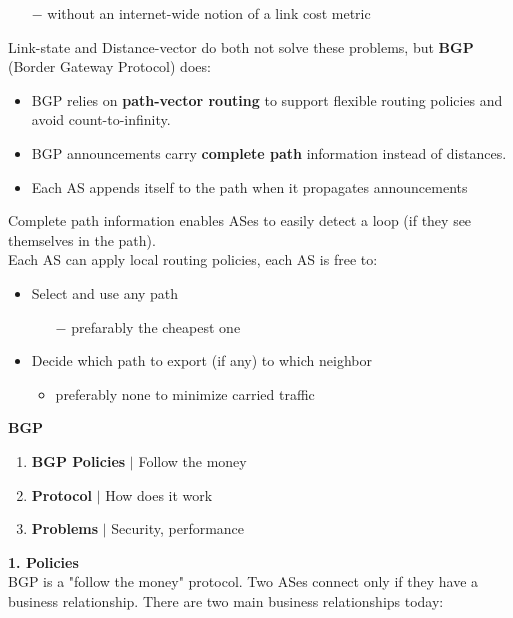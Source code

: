 \documentclass[a4paper, fontsize=8pt, landscape, DIV=1]{scrartcl}
\begin{document}
\begin{multicols*}{4}
\begin{itemize}[noitemsep]
\begin{itemize}
 				\item[$-$] without an internet-wide notion of a link cost metric
 			\end{itemize}		
		 \end{itemize}
	 	Link-state and Distance-vector do both not solve these problems, but \textbf{BGP} (Border Gateway Protocol) does:
	 	\begin{itemize}[noitemsep]
	 		\item BGP relies on \textbf{path-vector routing} to support flexible routing policies and avoid count-to-infinity.
	 		\item BGP announcements carry \textbf{complete path} information instead of distances.
	 		\item Each AS appends itself to the path when it propagates announcements
	 	\end{itemize}
	 	Complete path information enables ASes to easily detect a loop (if they see themselves in the path).\\
	 	Each AS can apply local routing policies, each AS is free to: 
	 	\begin{itemize}[noitemsep]
	 		\item Select and use any path
	 		\begin{itemize}
	 			\item[$-$]prefarably the cheapest one
	 		\end{itemize}
 			\item Decide which path to export (if any) to which neighbor 
 			\begin{itemize}
 				\item preferably none to minimize carried traffic
 			\end{itemize}
	 	\end{itemize}
	 	\textbf{BGP}\\
	 	\vspace{-0.2cm}
	 	\begin{enumerate}[noitemsep]
	 		\item \textbf{BGP Policies} $\vert$ Follow the money
	 		\item \textbf{Protocol} $\vert$ How does it work
	 		\item \textbf{Problems} $\vert$ Security, performance 
	 	\end{enumerate}
	 	\textbf{1. Policies}\\
	 	BGP is a "follow the money" protocol. Two ASes connect only if they have a business relationship. There are two main business relationships today: 

\end{multicols*}
\end{document}
